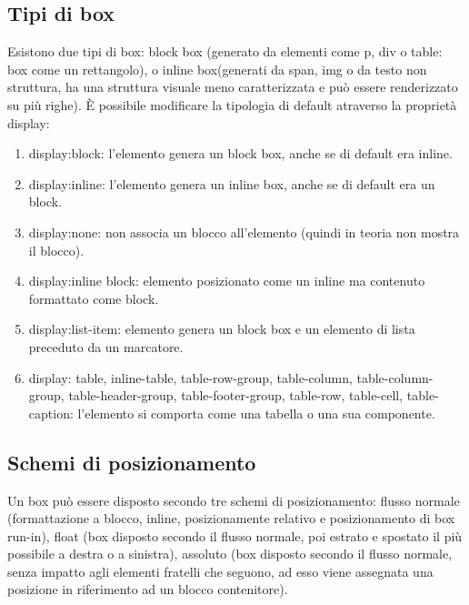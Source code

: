 \documentclass{article}
\begin{document}
\subsection{Tipi di box}
Esistono due tipi di box: block box (generato da elementi come p, div o table: box come un rettangolo), o inline box(generati da span, img o da testo non struttura, ha una struttura visuale meno caratterizzata e può essere renderizzato su più righe).
È possibile modificare la tipologia di default atraverso la proprietà display:
\begin{enumerate}
	\item display:block: l'elemento genera un block box, anche se di default era inline.
	\item display:inline: l'elemento genera un inline box, anche se di default era un block.
	\item display:none: non associa un blocco all'elemento (quindi in teoria non mostra il blocco).
	\item display:inline block: elemento posizionato come un inline ma contenuto formattato come block.
	\item display:list-item: elemento genera un block box e un elemento di lista preceduto da un marcatore.
	\item display: table, inline-table, table-row-group, table-column, table-column-group, table-header-group, table-footer-group, table-row, table-cell, table-caption: l'elemento si comporta come una tabella o una sua componente.
\end{enumerate}
\subsection{Schemi di posizionamento}
Un box può essere disposto secondo tre schemi di posizionamento: flusso normale (formattazione a blocco, inline, posizionamente relativo e posizionamento di box run-in), float (box disposto secondo il flusso normale, poi estrato e spostato il più possibile a destra o a sinistra), assoluto (box disposto secondo il flusso normale, senza impatto agli elementi fratelli che seguono, ad esso viene assegnata una posizione in riferimento ad un blocco contenitore).
\end{document}

